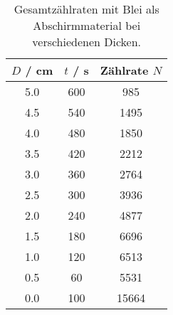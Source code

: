 \begin{table}[!htp]
\centering
\caption{Gesamtzählraten mit Blei als Abschirmmaterial bei verschiedenen Dicken.}
\label{tab:blei}
\begin{tabular}{S[table-format=1.1] S[table-format=3.0] S[table-format=5.0]}
\toprule
{$D$ / cm} & {$t$ / s} & {Zählrate $N$} \\
 & 600 &   985 \\
4.5 & 540 &  1495 \\
4.0 & 480 &  1850 \\
3.5 & 420 &  2212 \\
3.0 & 360 &  2764 \\
2.5 & 300 &  3936 \\
2.0 & 240 &  4877 \\
1.5 & 180 &  6696 \\
1.0 & 120 &  6513 \\
0.5 &  60 &  5531 \\
0.0 & 100 & 15664 \\
\bottomrule
\end{tabular}
\end{table}